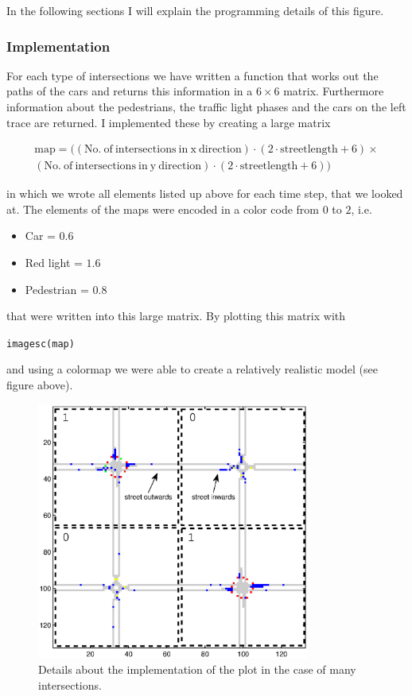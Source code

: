 In the following sections I will explain the programming details of this figure.

\subsubsection{Implementation}
For each type of intersections we have written a function that works out the paths of the cars and returns this information in a $6 \times 6$ matrix. Furthermore information about the pedestrians, the traffic light phases and the cars on the left trace are returned. I implemented these by creating a large matrix

\[
 \begin{split}
\mathrm{map} = (\mathrm{(No. \ of \ intersections \ in \ x \ direction)} \cdot (2 \cdot \mathrm{streetlength} + 6) \times \\ 
 \mathrm{(No. \ of \ intersections \ in \ y \ direction)} \cdot (2 \cdot \mathrm{streetlength} + 6))
\end{split}
\]

in which we wrote all elements listed up above for each time step, that we looked at. The elements of the maps were encoded in a color code from $0$ to $2$, i.e.
\begin{itemize}
	\item	Car = $0.6$
	\item	Red light = $1.6$
	\item	Pedestrian = $0.8$
\end{itemize}
that were written into this large matrix.
By plotting this matrix with
\begin{center}
\texttt{imagesc(map)}
\end{center}
and using a colormap we were able to create a relatively realistic model (see figure above).


\begin{figure}[htb]
	\centering
		\includegraphics[width=0.8\textwidth]{images/description_mapping_detail.eps}
	\caption{Details about the implementation of the plot in the case of many intersections.}
	\label{fig:description_mapping_detail}
\end{figure}

